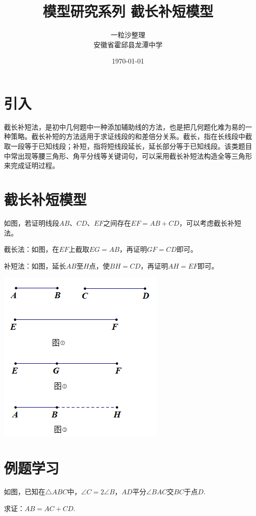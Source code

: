 \documentclass[10pt]{ctexart}
\title{模型研究系列 \quad 截长补短模型}
\author{一粒沙整理\\安徽省霍邱县龙潭中学}
\date{\today}
\begin{document}
\maketitle
\tableofcontents


\section{引入}
截长补短法，是初中几何题中一种添加辅助线的方法，也是把几何题化难为易的一种策略。截长补短的方法适用于求证线段的和差倍分关系。截长，指在长线段中截取一段等于已知线段；补短，指将短线段延长，延长部分等于已知线段。该类题目中常出现等腰三角形、角平分线等关键词句，可以采用截长补短法构造全等三角形来完成证明过程。

\section{截长补短模型}
如图，若证明线段$AB$、$CD$、$EF$之间存在$EF=AB+CD$，可以考虑截长补短法。

截长法：如图，在$EF$上截取$EG=AB$，再证明$GF=CD$即可。

补短法：如图，延长$AB$至$H$点，使$BH=CD$，再证明$AH=EF$即可。

\begin{center}
	\includegraphics[scale=0.6]{figure/jiechangbuduan01}
\end{center}

\section{例题学习}
\begin{shaded}
	\begin{example}
如图，已知在$\triangle ABC$中，$\angle C=2\angle B$，$AD$平分$\angle BAC$交$BC$于点$D$.

求证：$AB=AC+CD$.
	\end{example}
\end{shaded}
\end{document}
